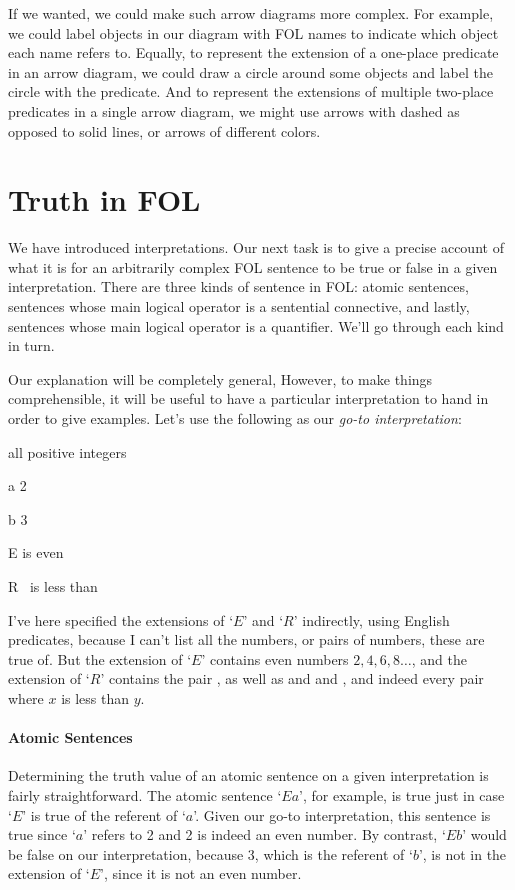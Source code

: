 If we wanted, we could make such arrow diagrams more complex. For example, we could label objects in our diagram with FOL names to indicate which object each name refers to.  Equally, to represent the extension of a one-place predicate in an arrow diagram, we could draw a circle around some objects and label the circle with the predicate. And to represent the extensions of multiple two-place predicates in a single arrow diagram, we might use arrows with dashed as opposed to solid lines, or arrows of different colors.



\section{Truth in FOL}\label{s:TruthFOL}

We have introduced interpretations. Our next task is to give a precise account of what it is for an arbitrarily complex FOL sentence to be true or false in a given interpretation. There are three kinds of sentence in FOL: atomic sentences, sentences whose main logical operator is a sentential connective, and lastly, sentences whose main logical operator is a quantifier.  We'll go through each kind in turn.

Our explanation will be completely general,  However, to make things comprehensible, it will be useful to have a particular interpretation to hand in order to give examples.  Let's use the following as our \emph{go-to interpretation}:
\begin{ekey}
		\item[\text{Domain}] all positive integers
		\item[a] 2
		\item[b] 3
		\item[E] \blank is even
		\item[R] \blank \ is less than \blank
	\end{ekey}
I've here specified the extensions of `$E$' and `$R$' indirectly, using English predicates, because I can't list all the numbers, or pairs of numbers, these are true of.  But the extension of `$E$' contains even numbers $2, 4, 6, 8 \ldots$, and the extension of `$R$' contains the pair , as well as  and  and , and indeed every pair  where $x$ is less than $y$.

\paragraph{Atomic Sentences} Determining the truth value of an atomic sentence on a given interpretation is fairly straightforward.  The atomic sentence `$Ea$', for example, is true just in case `$E$' is true of the referent of `$a$'.  Given our go-to interpretation, this sentence is true since `$a$' refers to 2 and 2 is indeed an even number.  By contrast, `$Eb$' would be false on our interpretation, because 3, which is the referent of `$b$', is not in the extension of `$E$', since it is not an even number.

